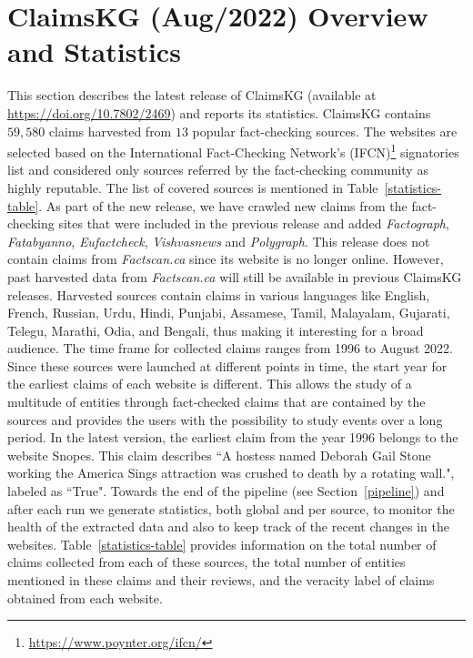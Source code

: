 \documentclass[
]{ceurart}
\begin{document}
\vspace{-3mm}
\section{ClaimsKG (Aug/2022) Overview and Statistics}
 \vspace{-2mm}
This section describes the latest release of ClaimsKG (available at \url{https://doi.org/10.7802/2469}) and reports its statistics.
 ClaimsKG contains $59,580$ claims harvested from $13$ popular fact-checking sources. The websites are selected based on the International Fact-Checking Network’s (IFCN)\footnote{\url{https://www.poynter.org/ifcn/}} signatories list and considered only sources
referred by the fact-checking community as highly reputable. The list of covered sources is mentioned in Table~\ref{statistics-table}. 
As part of the new release, we have crawled new claims from the fact-checking sites that were included in the previous release and added \textit{Factograph}, \textit{Fatabyanno}, \textit{Eufactcheck}, \textit{Vishvasnews} and  \textit{Polygraph}. This release does not contain  claims from  \textit{Factscan.ca} since its website is no longer online. However, past harvested data from \textit{Factscan.ca} will still be available in previous ClaimsKG releases. Harvested sources contain claims in various languages like English, French, Russian, Urdu, Hindi, Punjabi, Assamese, Tamil, Malayalam, Gujarati, Telegu, Marathi, Odia, and Bengali, thus making it interesting for a broad audience. The time frame for collected claims ranges from 1996 to August 2022. Since these sources were launched at different points in time, the start year for the earliest claims of each website is different. This allows the study of a multitude of entities through fact-checked claims that are contained by the sources and provides the users with the possibility to study events over a long period. In the latest version, the earliest claim from the year 1996  belongs to the website Snopes. This claim describes ``A hostess named Deborah Gail Stone working the America Sings attraction was crushed to death by a rotating wall.", labeled as ``True". Towards the end of the pipeline (see Section~\ref{pipeline}) and after each run we generate statistics, both global and per source, to monitor the health of the extracted data and also to keep track of the recent changes in the websites. Table~\ref{statistics-table} provides information on the total number of claims collected from each of these sources, the total number of entities mentioned in these claims and their reviews, and the veracity label of claims obtained from each website. %
\end{document}

